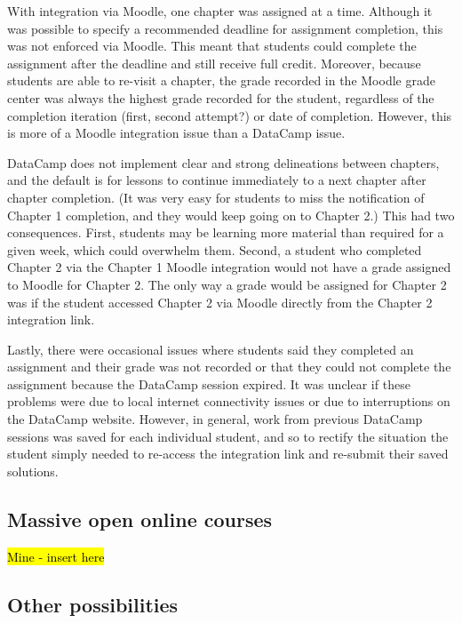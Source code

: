 \documentclass{tise_style_doi}
\begin{document}
With integration via Moodle, one chapter was assigned at a time.  Although it
was possible to specify a recommended deadline for assignment completion, this
was not enforced via Moodle.  This meant that students could complete the
assignment after the deadline and still receive full credit.  Moreover,
because students are able to re-visit a chapter, the grade recorded in the Moodle
grade center was always the highest grade recorded for the student, regardless of
the completion iteration (first, second attempt?) or date of completion.  However,
this is more of a Moodle integration issue than a DataCamp issue.

DataCamp does not implement clear and strong delineations between chapters, and the
default is for lessons to continue immediately to a next chapter after chapter
completion.  (It was very easy for students to miss the notification of Chapter 1
completion, and they would keep going on to Chapter 2.)  This had two consequences.
First, students may be learning more material than required for a given week, which
could overwhelm them.  Second, a student who completed Chapter 2 via the Chapter 1
Moodle integration would not have a grade assigned to Moodle for Chapter 2.  The only
way a grade would be assigned for Chapter 2 was if the student accessed Chapter 2 via
Moodle directly from the Chapter 2 integration link.

Lastly, there were occasional issues where students said they completed an assignment
and their grade was not recorded or that they could not complete the assignment because
the DataCamp session expired.  It was unclear if these problems were due to local internet
connectivity issues or due to interruptions on the DataCamp website.  However, in general,
work from previous DataCamp sessions was saved for each individual student, and so to
rectify the situation the student simply needed to re-access the integration link and
re-submit their saved solutions.

\subsection{Massive open online courses}

\hl{Mine - insert here}


\subsection{Other possibilities}
\end{document}
